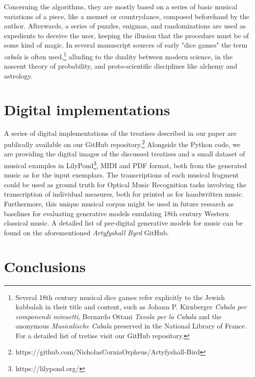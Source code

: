 \documentclass{article}
\begin{document}
Concerning the algorithms, they are mostly based on a series of basic musical variations of a piece, like a menuet or countrydance, composed beforehand by the author. Afterwards, a series of puzzles, enigmas, and randomizations are used as expedients to deceive the user, keeping the illusion that the procedure must be of some kind of magic. In several manuscript sources of early "dice games"  the term \textit{cabala} is often used,\footnote{Several 18th century musical dice games refer explicitly to the Jewish kabbalah in their title and content, such as Johann P. Kirnberger \textit{Cabala per componendi minuetti}, Bernardo Ottani \textit{Tavola per la Cabala} and the anonymous \textit{Musicalische Cabala} preserved in the National Library of France. For a detailed list of tretise visit our GitHub repository.}   alluding to the duality between modern science, in the nascent theory of probability, and proto-scientific disciplines like alchemy and astrology. \cite{forshaw2010oratorium} 



\section{Digital implementations}

A series of digital implementations of the treatises described in our paper are publically available on our GitHub repository.\footnote{https://github.com/NicholasCorniaOrpheus/Artyfyshall-Bird} 
Alongside the Python code, we are providing the digital images of the discussed treatises and a small dataset of musical examples in LilyPond\footnote{https://lilypond.org/}, MIDI and PDF format, both from the generated music as for the input exemplars. The transcriptions of each musical fragment could be used as ground truth for Optical Music Recognition tasks involving the transcription of individual measures, both for printed as for handwritten music. \cite{calvo-zaragoza_understanding_2020} Furthermore, this unique musical corpus might be used in future research as baselines for evaluating generative models emulating 18th century Western classical music. A detailed list of pre-digital generative models for music can be found on the aforementioned \textit{Artyfyshall Byrd} GitHub.

\section{Conclusions}
\end{document}
